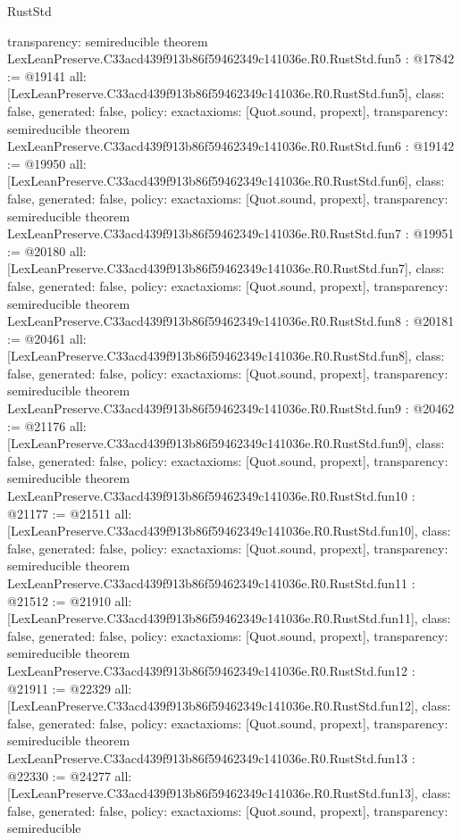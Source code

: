 \begin{lexlean}{RustStd}
\begin{coremodule}
{  transparency: semireducible
}
theorem LexLeanPreserve.C33acd439f913b86f59462349c141036e.R0.RustStd.fun5 : @17842 := @19141 {
  all: [LexLeanPreserve.C33acd439f913b86f59462349c141036e.R0.RustStd.fun5],
  class: false,
  generated: false,
  policy: exact{axioms: [Quot.sound, propext]},
  transparency: semireducible
}
theorem LexLeanPreserve.C33acd439f913b86f59462349c141036e.R0.RustStd.fun6 : @19142 := @19950 {
  all: [LexLeanPreserve.C33acd439f913b86f59462349c141036e.R0.RustStd.fun6],
  class: false,
  generated: false,
  policy: exact{axioms: [Quot.sound, propext]},
  transparency: semireducible
}
theorem LexLeanPreserve.C33acd439f913b86f59462349c141036e.R0.RustStd.fun7 : @19951 := @20180 {
  all: [LexLeanPreserve.C33acd439f913b86f59462349c141036e.R0.RustStd.fun7],
  class: false,
  generated: false,
  policy: exact{axioms: [Quot.sound, propext]},
  transparency: semireducible
}
theorem LexLeanPreserve.C33acd439f913b86f59462349c141036e.R0.RustStd.fun8 : @20181 := @20461 {
  all: [LexLeanPreserve.C33acd439f913b86f59462349c141036e.R0.RustStd.fun8],
  class: false,
  generated: false,
  policy: exact{axioms: [Quot.sound, propext]},
  transparency: semireducible
}
theorem LexLeanPreserve.C33acd439f913b86f59462349c141036e.R0.RustStd.fun9 : @20462 := @21176 {
  all: [LexLeanPreserve.C33acd439f913b86f59462349c141036e.R0.RustStd.fun9],
  class: false,
  generated: false,
  policy: exact{axioms: [Quot.sound, propext]},
  transparency: semireducible
}
theorem LexLeanPreserve.C33acd439f913b86f59462349c141036e.R0.RustStd.fun10 : @21177 := @21511 {
  all: [LexLeanPreserve.C33acd439f913b86f59462349c141036e.R0.RustStd.fun10],
  class: false,
  generated: false,
  policy: exact{axioms: [Quot.sound, propext]},
  transparency: semireducible
}
theorem LexLeanPreserve.C33acd439f913b86f59462349c141036e.R0.RustStd.fun11 : @21512 := @21910 {
  all: [LexLeanPreserve.C33acd439f913b86f59462349c141036e.R0.RustStd.fun11],
  class: false,
  generated: false,
  policy: exact{axioms: [Quot.sound, propext]},
  transparency: semireducible
}
theorem LexLeanPreserve.C33acd439f913b86f59462349c141036e.R0.RustStd.fun12 : @21911 := @22329 {
  all: [LexLeanPreserve.C33acd439f913b86f59462349c141036e.R0.RustStd.fun12],
  class: false,
  generated: false,
  policy: exact{axioms: [Quot.sound, propext]},
  transparency: semireducible
}
theorem LexLeanPreserve.C33acd439f913b86f59462349c141036e.R0.RustStd.fun13 : @22330 := @24277 {
  all: [LexLeanPreserve.C33acd439f913b86f59462349c141036e.R0.RustStd.fun13],
  class: false,
  generated: false,
  policy: exact{axioms: [Quot.sound, propext]},
  transparency: semireducible
}
\end{coremodule}
\end{lexlean}
